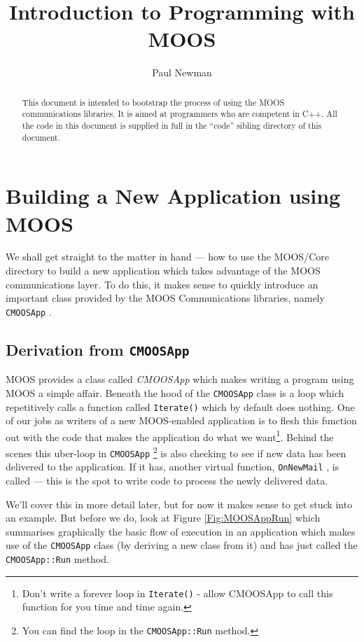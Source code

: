 \documentclass[a4paper,10pt]{article}
\title{Introduction to Programming with MOOS}
\author{Paul Newman}
\newcommand{\Code}[1]{\texttt{#1} }
\newcommand{\code}[1]{\Code{#1} }
\begin{document}
\maketitle

\begin{center}
\end{center}

\begin{abstract}
This document is intended to bootstrap the process of using the
MOOS communications libraries. It is aimed at programmers who are
competent in C++. All the code in this document is supplied
in full in the ``code'' sibling directory of this document.
\end{abstract}
\newpage
\tableofcontents
\newpage
\section{Building a New Application using MOOS}

We shall get straight to the matter in hand --- how to use the
MOOS/Core directory to build a new application which takes
advantage of the MOOS communications layer. To do this, it makes
sense to quickly introduce an important class provided by the MOOS
Communications libraries, namely \code{CMOOSApp}.


\subsection{Derivation from \code{CMOOSApp}}
MOOS provides a class called \textit{CMOOSApp} which makes writing
a program using MOOS a simple affair. Beneath the hood of the
\code{CMOOSApp} class is a loop which repetitively calls a
function called \code{Iterate()} which by default does nothing.
One of our jobs as writers of a new MOOS-enabled application is to
flesh this function out with the code that makes the application
do what we want\footnote{Don't write a forever loop in
\code{Iterate()} - allow CMOOSApp to call this function for you
time and time again.}. Behind the scenes this uber-loop in
\code{CMOOSApp}\footnote{You can find the loop in the
\code{CMOOSApp::Run} method.} is also checking to see if new data
has been delivered to the application. If it has, another virtual
function, \code{OnNewMail}, is called --- this is the spot to write
code to process the newly delivered data. 

We'll cover this in more detail later, but for now it makes sense
to get stuck into an example. But before we do, look at Figure
\ref{Fig:MOOSAppRun} which summarises graphically the basic flow
of execution in an application which makes use of the \code{CMOOSApp}
class (by deriving a new class from it) and has just called the
\code{CMOOSApp::Run} method.
\end{document}
